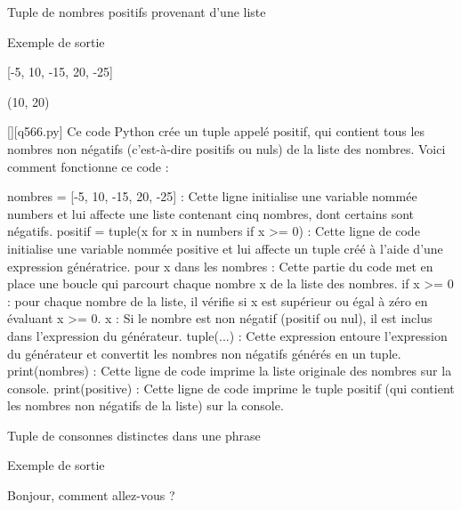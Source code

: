         \question
        Tuple de nombres positifs provenant d'une liste

Exemple de sortie

[-5, 10, -15, 20, -25]

(10, 20)
        \par
        \begin{solution}
            \renewcommand{\nomfichier}{q566.py}
            \pythonfile{\chemincode \nomfichier}[][\nomfichier]
            Ce code Python crée un tuple appelé positif, qui contient tous les nombres non négatifs (c'est-à-dire positifs ou nuls) de la liste des nombres. Voici comment fonctionne ce code :

    nombres = [-5, 10, -15, 20, -25] : Cette ligne initialise une variable nommée numbers et lui affecte une liste contenant cinq nombres, dont certains sont négatifs.
    positif = tuple(x for x in numbers if x >= 0) : Cette ligne de code initialise une variable nommée positive et lui affecte un tuple créé à l'aide d'une expression génératrice.
        pour x dans les nombres : Cette partie du code met en place une boucle qui parcourt chaque nombre x de la liste des nombres.
        if x >= 0 : pour chaque nombre de la liste, il vérifie si x est supérieur ou égal à zéro en évaluant x >= 0.
        x : Si le nombre est non négatif (positif ou nul), il est inclus dans l'expression du générateur.
        tuple(...) : Cette expression entoure l'expression du générateur et convertit les nombres non négatifs générés en un tuple.
    print(nombres) : Cette ligne de code imprime la liste originale des nombres sur la console.
    print(positive) : Cette ligne de code imprime le tuple positif (qui contient les nombres non négatifs de la liste) sur la console.
        \end{solution}
        

        \question
        Tuple de consonnes distinctes dans une phrase

Exemple de sortie

Bonjour, comment allez-vous ?

